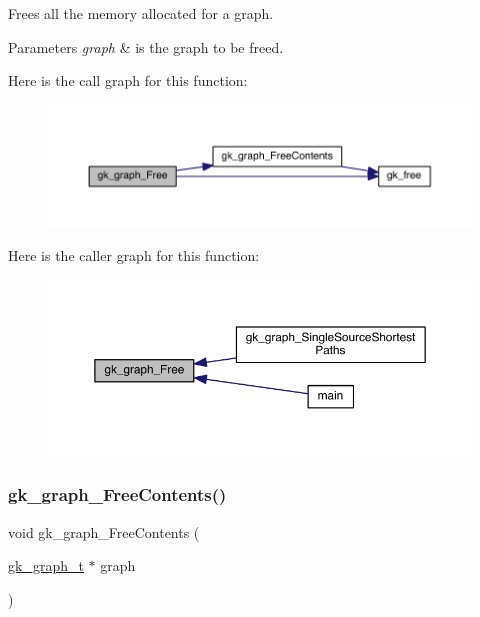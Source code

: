 Frees all the memory allocated for a graph. 
\begin{DoxyParams}{Parameters}
{\em graph} & is the graph to be freed. \\
\hline
\end{DoxyParams}
Here is the call graph for this function\+:\nopagebreak
\begin{figure}[H]
\begin{center}
\leavevmode
\includegraphics[width=350pt]{a00077_a1c12a8da8ea4064302668e0ce94ad462_cgraph}
\end{center}
\end{figure}
Here is the caller graph for this function\+:\nopagebreak
\begin{figure}[H]
\begin{center}
\leavevmode
\includegraphics[width=350pt]{a00077_a1c12a8da8ea4064302668e0ce94ad462_icgraph}
\end{center}
\end{figure}
\mbox{\label{a00077_a00a7be5e2819fb9444360695e8d047d3}} 
\subsubsection{\texorpdfstring{gk\+\_\+graph\+\_\+\+Free\+Contents()}{gk\_graph\_FreeContents()}}
{\footnotesize\ttfamily void gk\+\_\+graph\+\_\+\+Free\+Contents (\begin{DoxyParamCaption}\item[{\hyperlink{a00638}{gk\+\_\+graph\+\_\+t} $\ast$}]{graph }\end{DoxyParamCaption})}

